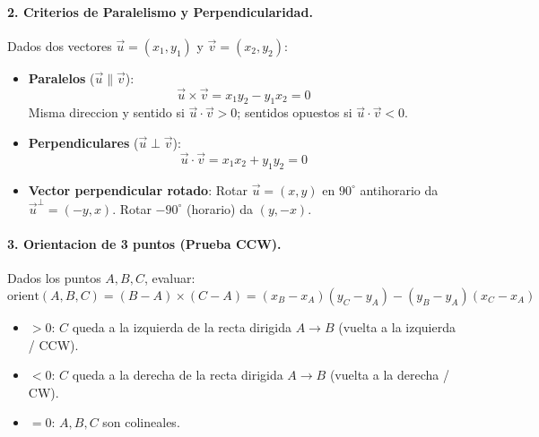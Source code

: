 \begin{center}
\end{center}

\paragraph{2. Criterios de Paralelismo y Perpendicularidad.}
Dados dos vectores $\vec{u} = (x_1, y_1)$ y $\vec{v} = (x_2, y_2)$:
\begin{itemize}\setlength\itemsep{0pt}
	\item \textbf{Paralelos} ($\vec{u} \parallel \vec{v}$):
	\[
		\vec{u} \times \vec{v} = x_1 y_2 - y_1 x_2 = 0
	\]
	Misma direccion y sentido si $\vec{u} \cdot \vec{v} > 0$; sentidos opuestos si $\vec{u} \cdot \vec{v} < 0$.
	\item \textbf{Perpendiculares} ($\vec{u} \perp \vec{v}$):
	\[
		\vec{u} \cdot \vec{v} = x_1 x_2 + y_1 y_2 = 0
	\]
	\item \textbf{Vector perpendicular rotado}:
	Rotar $\vec{u} = (x, y)$ en $90^\circ$ antihorario da $\vec{u}^\perp = (-y, x)$. Rotar $-90^\circ$ (horario) da $(y, -x)$.
\end{itemize}

\paragraph{3. Orientacion de 3 puntos (Prueba CCW).}
Dados los puntos $A, B, C$, evaluar:
\[
	\text{orient}(A, B, C) = (B - A) \times (C - A) = (x_B - x_A)(y_C - y_A) - (y_B - y_A)(x_C - x_A)
\]
\begin{itemize}\setlength\itemsep{0pt}
	\item $> 0$: $C$ queda a la izquierda de la recta dirigida $A \to B$ (vuelta a la izquierda / CCW).
	\item $< 0$: $C$ queda a la derecha de la recta dirigida $A \to B$ (vuelta a la derecha / CW).
	\item $= 0$: $A, B, C$ son colineales.
\end{itemize}

